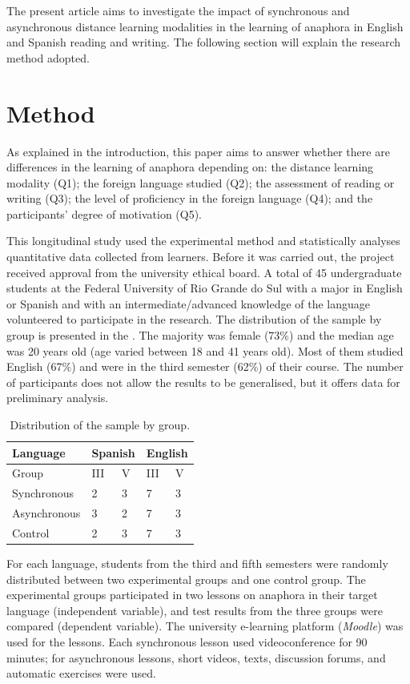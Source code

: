 \documentclass{textolivre}
\begin{document}
The present article aims to investigate the impact of synchronous and
asynchronous distance learning modalities in the learning of anaphora in
English and Spanish reading and writing. The following section will
explain the research method adopted.


\section{Method}\label{sec-method}
As explained in the introduction, this paper aims to answer whether
there are differences in the learning of anaphora depending on: the
distance learning modality (Q1); the foreign language studied (Q2); the
assessment of reading or writing (Q3); the level of proficiency in the
foreign language (Q4); and the participants' degree of motivation (Q5).

This longitudinal study used the experimental method and statistically
analyses quantitative data collected from learners. Before it was
carried out, the project received approval from the university ethical
board. A total of 45 undergraduate students at the Federal University of
Rio Grande do Sul with a major in English or Spanish and with an
intermediate/advanced knowledge of the language volunteered to
participate in the research. The distribution of the sample by group is
presented in the . The majority was female (73\%) and the
median age was 20 years old (age varied between 18 and 41 years old).
Most of them studied English (67\%) and were in the third semester
(62\%) of their course. The number of participants does not allow the
results to be generalised, but it offers data for preliminary analysis.

\begin{table}[htpb]
\caption{Distribution of the sample by group.}
\label{tbl01}
\centering
\begin{tabular}{lllll}
\toprule
Language & \multicolumn{2}{l}{Spanish} & \multicolumn{2}{l}{English} \\
\midrule 
Group & III & V & III & V\\
Synchronous & 2 & 3 & 7 & 3\\
Asynchronous & 3 & 2 & 7 & 3\\
Control & 2 & 3 & 7 & 3\\
\bottomrule
\end{tabular}
\end{table}


For each language, students from the third and fifth semesters were
randomly distributed between two experimental groups and one control
group. The experimental groups participated in two lessons on anaphora
in their target language (independent variable), and test results from
the three groups were compared (dependent variable). The university
e-learning platform (\emph{Moodle}) was used for the lessons. Each
synchronous lesson used videoconference for 90 minutes; for asynchronous
lessons, short videos, texts, discussion forums, and automatic exercises
were used.
\end{document}
